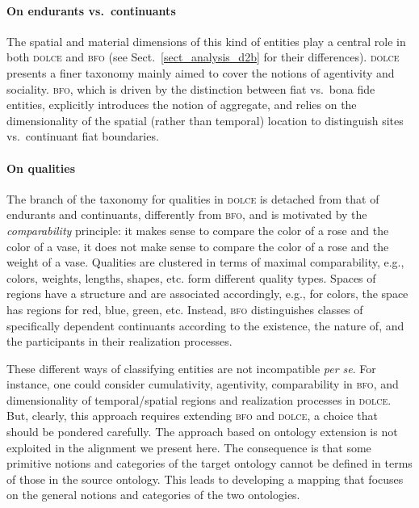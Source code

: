 \documentclass[ao]{iosart2x}
\newcommand{\dolce}{{\textsc{dolce}}}
\newcommand{\bfo}{{\textsc{bfo}}}
\begin{document}
\paragraph{On endurants vs.~continuants} The spatial and material dimensions of this kind of entities play a central role in both {\dolce} and {\bfo} (see Sect.~\ref{sect_analysis_d2b} for their differences). {\dolce} presents a finer taxonomy mainly aimed to cover the notions of agentivity and sociality. {\bfo}, which is driven by the distinction between fiat vs.~bona fide entities, explicitly introduces the notion of aggregate, and relies on the dimensionality of the spatial (rather than temporal) location to distinguish sites vs.~continuant fiat boundaries.

\paragraph{On qualities} The branch of the taxonomy for qualities in {\dolce} is detached from that of endurants and continuants, differently from {\bfo}, and is motivated by the \emph{comparability} principle: it makes sense to compare the color of a rose and the color of a vase, it does not make sense to compare the color of a rose and the weight of a vase. Qualities are clustered in terms of maximal comparability, e.g., colors, weights, lengths, shapes, etc. form different quality types. Spaces of regions have a structure and are associated accordingly, e.g., for colors, the space has regions for red, blue, green, etc. Instead, {\bfo} distinguishes classes of specifically dependent continuants according to the existence, the nature of, and the participants in their realization processes.

\smallskip
These different ways of classifying entities are not incompatible \textit{per se}. For instance, one could consider cumulativity, agentivity, comparability in {\bfo}, and dimensionality of temporal/spatial regions and realization processes in {\dolce}. But, clearly, this approach requires extending {\bfo} and {\dolce}, a choice that should be pondered carefully. The approach based on ontology extension is not exploited in the alignment we present here. The consequence is that some primitive notions and categories of the target ontology cannot be defined in terms of those in the source ontology. This leads to developing a mapping that focuses on the general notions and categories of the two ontologies.
   
\end{document}
